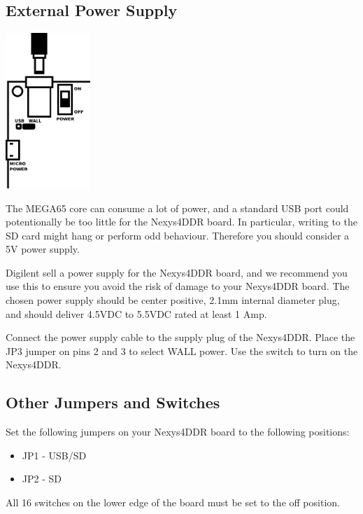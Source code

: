\subsection{External Power Supply}

\hspace*{1.7cm}
\includegraphics[width=3.2cm]{images/illustrations/nexys-power-supply.pdf}

The MEGA65 core can consume a lot of power, and a standard USB port could potentionally be too little for the Nexys4DDR board. In particular, writing to the SD card might hang or perform odd behaviour. Therefore you should consider a 5V power supply.

Digilent sell a power supply for the Nexys4DDR board, and we recommend you use this to ensure you avoid the risk of damage to your Nexys4DDR board. The chosen power supply should be center positive, 2.1mm internal diameter plug, and should deliver 4.5VDC to 5.5VDC rated at least 1 Amp.

Connect the power supply cable to the supply plug of the Nexys4DDR. Place the JP3 jumper on pins 2 and 3 to select WALL power. Use the switch to turn on the Nexys4DDR.

\subsection{Other Jumpers and Switches}

Set the following jumpers on your Nexys4DDR board to the following positions:

\begin{itemize}
\item{JP1} - USB/SD
\item{JP2} - SD
\end{itemize}


All 16 switches on the lower edge of the board must be set to the off position.


